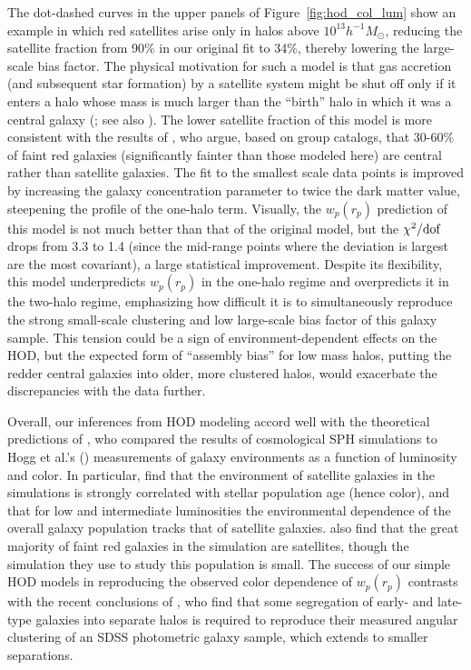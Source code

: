 \documentclass[]{emulateapj}
\newcommand{\wrp}{{w_p(r_p)}}
\def\hMsun{h^{-1}M_\odot}
\begin{document}
The dot-dashed curves in 
the upper panels of Figure~\ref{fig:hod_col_lum} show an example
in which red satellites arise only in halos above $10^{13}\hMsun$,
reducing the satellite fraction from 90\% in our original fit
to 34\%, thereby lowering the large-scale bias factor.
The physical motivation for such a model is that gas accretion (and
subsequent star formation) by a satellite system might be shut off only if
it enters a halo whose mass is much larger than the ``birth'' halo
in which it was a central galaxy (\citealt{simha09}; see also 
\citealt{font08,kang08,skibba09a}). The lower satellite 
fraction of this model is more consistent with the results of
\cite{wang09}, who argue, based on group catalogs, that 30-60\%
of faint red galaxies (significantly fainter than those modeled here)
are central rather than satellite galaxies.
The fit to the smallest scale data points is improved by increasing
the galaxy concentration parameter \citep{bosch08} 
to twice the dark matter value, steepening the profile of the one-halo term.
Visually, the $\wrp$ prediction of this model is not much
better than that of the original model, but the $\chi^2/{\rm dof}$ 
drops from 3.3 to 1.4 (since the mid-range points where the deviation is 
largest are the most covariant), a large statistical improvement.
Despite its flexibility,
this model underpredicts $\wrp$ in the one-halo regime and overpredicts it
in the two-halo regime, emphasizing how difficult it is to simultaneously
reproduce the strong small-scale clustering and low large-scale bias factor
of this galaxy sample.
This tension could be a sign of environment-dependent effects on the HOD, 
but the expected form of ``assembly bias'' for low mass halos,
putting the redder central galaxies into older, more clustered halos,
would exacerbate the discrepancies with the data further.

Overall, 
our inferences from HOD modeling accord well with the theoretical
predictions of \cite{berlind05}, who compared the results of
cosmological SPH simulations to Hogg et al.'s (\citeyear{hogg03})
measurements of galaxy environments as a function of luminosity and color.
In particular, \cite{berlind05} find that the environment of satellite
galaxies in the simulations is strongly correlated with stellar population
age (hence color), and that for low and intermediate luminosities
the environmental dependence of the overall galaxy population tracks that
of satellite galaxies.  \cite{berlind05} also find that the great
majority of faint red galaxies in the simulation are satellites,
though the simulation they use to study this population is small.
The success of our simple HOD models in reproducing the observed
color dependence of $\wrp$ contrasts with the recent conclusions
of \cite{ross09}, who find that some segregation of early- and 
late-type galaxies into separate halos is required to reproduce 
their measured angular clustering of an SDSS photometric galaxy sample,
which extends to smaller separations. 
\end{document}
